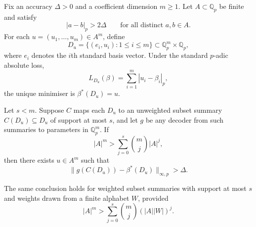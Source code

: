 \begin{thm}
\label{prop:subset-summary-lower-bound}
Fix an accuracy $\Delta>0$ and a coefficient dimension $m\ge 1$. Let
$A\subset \mathbb{Q}_p$ be finite and satisfy
\[
|a-b|_p>2\Delta \qquad\text{for all distinct } a,b\in A.
\]
For each $u=(u_1,\dots,u_m)\in A^m$, define
\[
D_u=\{(e_i,u_i):1\le i\le m\}\subset \mathbb{Q}_p^m\times \mathbb{Q}_p,
\]
where $e_i$ denotes the $i$th standard basis vector. Under the standard
$p$-adic absolute loss,
\[
L_{D_u}(\beta)=\sum_{i=1}^m |u_i-\beta_i|_p,
\]
the unique minimiser is $\beta^\ast(D_u)=u$.

Let $s<m$. Suppose $C$ maps each $D_u$ to an unweighted subset summary
$C(D_u)\subseteq D_u$ of support at most $s$, and let $g$ be any decoder from
such summaries to parameters in $\mathbb{Q}_p^m$. If
\[
|A|^m>\sum_{j=0}^{s}\binom{m}{j}|A|^j,
\]
then there exists $u\in A^m$ such that
\[
\|g(C(D_u))-\beta^\ast(D_u)\|_{\infty,p}>\Delta.
\]

The same conclusion holds for weighted subset summaries with support at most $s$
and weights drawn from a finite alphabet $W$, provided
\[
|A|^m>\sum_{j=0}^{s}\binom{m}{j}(|A||W|)^j.
\]
\end{thm}
